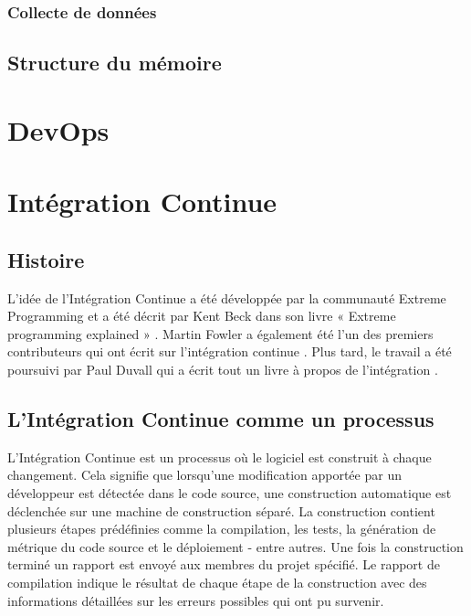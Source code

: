 \documentclass{report}
\begin{document}
      \subsection{Collecte de données}

    \section{Structure du mémoire}

  \chapter{DevOps}

  \chapter{Intégration Continue}

    \section{Histoire}
    L'idée de l'Intégration Continue a été développée par la communauté Extreme Programming et a été décrit par Kent Beck dans son livre « Extreme programming explained » \cite{Bec99}. Martin Fowler a également été l'un des premiers contributeurs qui ont écrit sur l’intégration continue \cite{Fow00}. Plus tard, le travail a été poursuivi par Paul Duvall qui a écrit tout un livre à propos de l’intégration \cite{Duv07}.

    \section{L'Intégration Continue comme un processus}
    L’Intégration Continue est un processus où le logiciel est construit à chaque changement. Cela signifie que lorsqu’une modification apportée par un développeur est détectée dans le code source, une construction automatique est déclenchée sur une machine de construction séparé. La construction contient plusieurs étapes prédéfinies comme la compilation, les tests, la génération de métrique du code source et le déploiement - entre autres. Une fois la construction terminé un rapport est envoyé aux membres du projet spécifié. Le rapport de compilation indique le résultat de chaque étape de la construction avec des informations détaillées sur les erreurs possibles qui ont pu survenir.\\\\
\end{document}
